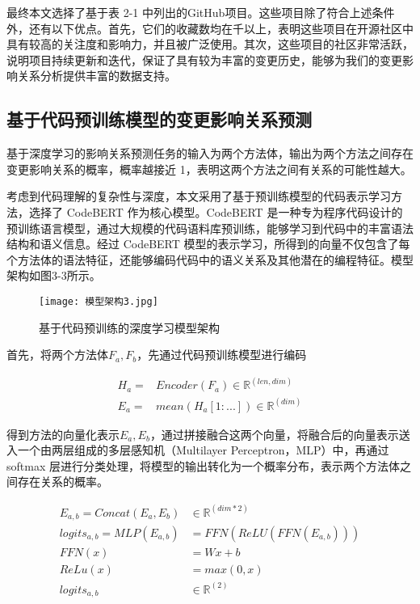 最终本文选择了基于表 2-1 中列出的GitHub项目。这些项目除了符合上述条件外，还有以下优点。首先，它们的收藏数均在千以上，表明这些项目在开源社区中具有较高的关注度和影响力，并且被广泛使用。其次，这些项目的社区非常活跃，说明项目持续更新和迭代，保证了具有较为丰富的变更历史，能够为我们的变更影响关系分析提供丰富的数据支持。

\subsection{基于代码预训练模型的变更影响关系预测}

基于深度学习的影响关系预测任务的输入为两个方法体，输出为两个方法之间存在变更影响关系的概率，概率越接近 1，表明这两个方法之间有关系的可能性越大。

考虑到代码理解的复杂性与深度，本文采用了基于预训练模型的代码表示学习方法，选择了 CodeBERT 作为核心模型。CodeBERT 是一种专为程序代码设计的预训练语言模型，通过大规模的代码语料库预训练，能够学习到代码中的丰富语法结构和语义信息。经过 CodeBERT 模型的表示学习，所得到的向量不仅包含了每个方法体的语法特征，还能够编码代码中的语义关系及其他潜在的编程特征。模型架构如图3-3所示。

\begin{figure}[h]
\centering
\texttt{[image: 模型架构3.jpg]}
\caption{基于代码预训练的深度学习模型架构}
\end{figure}


首先，将两个方法体$ F_a, F_b$，先通过代码预训练模型进行编码

\begin{align}
H_a=&Encoder(F_a) \in \mathbb{R}^{(len,dim)} \\
E_a=&mean(H_a[1:...]) \in \mathbb{R}^{(dim)}
\end{align}

得到方法的向量化表示$ E_a, E_b$，通过拼接融合这两个向量，将融合后的向量表示送入一个由两层组成的多层感知机（Multilayer Perceptron，MLP）中，再通过 softmax 层进行分类处理，将模型的输出转化为一个概率分布，表示两个方法体之间存在关系的概率。

\begin{align}
E_{a,b}=Concat(E_a,E_b)& \in \mathbb{R}^{(dim*2)} \\
logits_{a,b}=MLP(E_{a,b})&=FFN(ReLU(FFN(E_{a,b}))) \\
FFN(x)&=Wx+b\\
ReLu(x)&=max(0,x)\\
logits_{a,b}& \in \mathbb{R}^{(2)}
\end{align}

